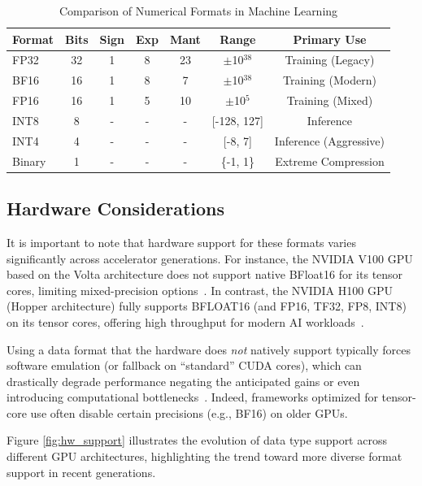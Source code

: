 \begin{table}[ht]
  \centering
  \caption{Comparison of Numerical Formats in Machine Learning}
  \label{tab:format_comparison}
  \begin{tabular}{@{}lcccccc@{}}
    \toprule
    \textbf{Format} & \textbf{Bits} & \textbf{Sign} & \textbf{Exp} & \textbf{Mant} & \textbf{Range} & \textbf{Primary Use} \\
    \midrule
    FP32   & 32 & 1 & 8  & 23 & $\pm$10$^{38}$ & Training (Legacy) \\
    BF16   & 16 & 1 & 8  & 7  & $\pm$10$^{38}$ & Training (Modern) \\
    FP16   & 16 & 1 & 5  & 10 & $\pm$10$^{5}$  & Training (Mixed) \\
    INT8   & 8  & - & -  & -  & [-128, 127]    & Inference \\
    INT4   & 4  & - & -  & -  & [-8, 7]        & Inference (Aggressive) \\
    Binary & 1  & - & -  & -  & \{-1, 1\}      & Extreme Compression \\
    \bottomrule
  \end{tabular}
\end{table}

\subsection{Hardware Considerations}

It is important to note that hardware support for these formats varies significantly across accelerator generations.
For instance, the NVIDIA V100 GPU based on the Volta architecture does not support native BFloat16 for its tensor cores, limiting mixed-precision options~\cite{datacrunch_v100_2025}.
In contrast, the NVIDIA H100 GPU (Hopper architecture) fully supports BFLOAT16 (and FP16, TF32, FP8, INT8) on its tensor cores, offering high throughput for modern AI workloads~\cite{nvidia_h100_specs_2025,nvidia_hopper_arch_in_depth_2022}.

Using a data format that the hardware does \emph{not} natively support typically forces software emulation (or fallback on “standard” CUDA cores), which can drastically degrade performance  negating the anticipated gains or even introducing computational bottlenecks~\cite{tensorrt_support_matrix_2025}.
Indeed, frameworks optimized for tensor-core use often disable certain precisions (e.g., BF16) on older GPUs.

Figure \ref{fig:hw_support} illustrates the evolution of data type support across different GPU architectures, highlighting the trend toward more diverse format support in recent generations.

